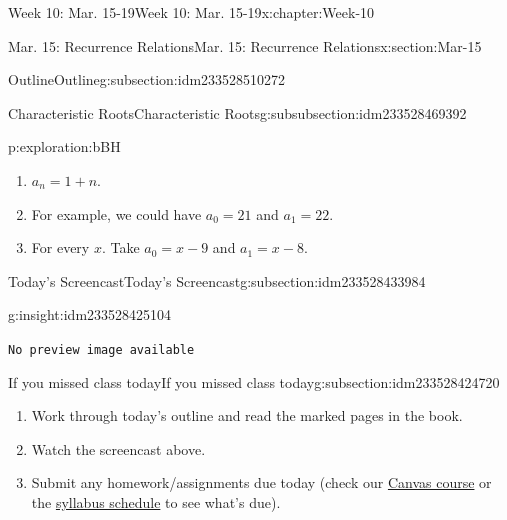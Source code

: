 \documentclass[oneside,10pt,]{book}
\newcommand{\mono}[1]{\texttt{#1}}
\numberwithin{equation}{section}
\newlength{\qrsize}
\newlength{\previewwidth}
\begin{document}
\begin{chapterptx}{Week 10: Mar. 15-19}{}{Week 10: Mar. 15-19}{}{}{x:chapter:Week-10}
\begin{sectionptx}{Mar. 15: Recurrence Relations}{}{Mar. 15: Recurrence Relations}{}{}{x:section:Mar-15}
\begin{subsectionptx}{Outline}{}{Outline}{}{}{g:subsection:idm233528510272}
\begin{subsubsectionptx}{Characteristic Roots}{}{Characteristic Roots}{}{}{g:subsubsection:idm233528469392}
\begin{exploration}{}{p:exploration:bBH}
\begin{enumerate}
\item{}\(a_n = 1 + n\).%
\item{}For example, we could have \(a_0 = 21\) and \(a_1 = 22\).%
\item{}For every \(x\). Take \(a_0 = x-9\) and \(a_1 = x-8\).%
\end{enumerate}
%
\end{exploration}%
\end{subsubsectionptx}
\end{subsectionptx}
%
%
\typeout{************************************************}
\typeout{************************************************}
%
\begin{subsectionptx}{Today's Screencast}{}{Today's Screencast}{}{}{g:subsection:idm233528433984}
\begin{insight}{}{g:insight:idm233528425104}%
\setlength{\qrsize}{9em}
\setlength{\previewwidth}{\linewidth}
\addtolength{\previewwidth}{-\qrsize}
\begin{tcbraster}[raster columns=2, raster column skip=1pt, raster halign=center, raster force size=false, raster left skip=0pt, raster right skip=0pt]%
\begin{tcolorbox}[previewstyle, width=\previewwidth]%
\mono{No preview image available}%
\end{tcolorbox}%
\begin{tcolorbox}[qrstyle]%
[QR LINK]\end{tcolorbox}%
\end{tcbraster}%
\end{insight}
\end{subsectionptx}
%
%
\typeout{************************************************}
\typeout{************************************************}
%
\begin{subsectionptx}{If you missed class today}{}{If you missed class today}{}{}{g:subsection:idm233528424720}
%
\begin{enumerate}
\item{}Work through today's outline and read the marked pages in the book.%
\item{}Watch the screencast above.%
\item{}Submit any homework\slash{}assignments due today (check our \href{https://dordt.instructure.com/courses/3110050}{Canvas course} or the \href{https://prof.mkjanssen.org/ds/index.html\#schedule}{syllabus schedule} to see what's due).%

\end{enumerate}
\end{subsectionptx}
\end{sectionptx}
\end{chapterptx}
\end{document}
